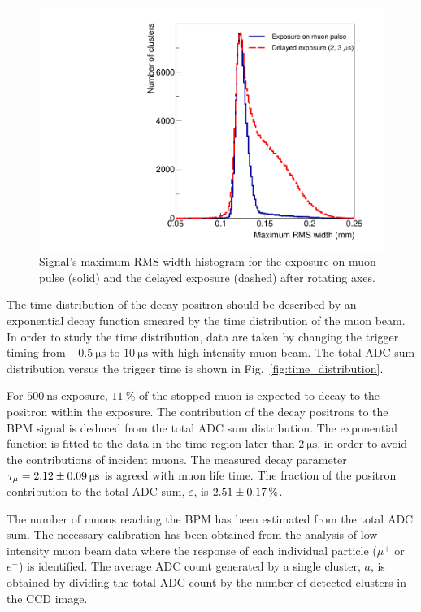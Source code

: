\documentclass[preprint,3p,twocolumn]{elsarticle}
\begin{document}
\begin{figure}[tbp]
	\centering
	\includegraphics[width=\columnwidth]{figure/RMS_legend_v2.pdf}
	\caption{Signal's maximum RMS width histogram for the
          exposure on muon pulse (solid) and the delayed exposure
          (dashed) after rotating axes.}
	\label{fig:positron_width}
\end{figure}

The time distribution of the decay positron should be described
by an exponential decay function smeared by the time distribution
of the muon beam.  In order to study the time distribution, data
are taken by changing the trigger timing from
$\SI{-0.5}{\micro\s}$ to $\SI{10}{\micro\s}$ with high intensity
muon beam. The total ADC sum distribution versus the trigger time
is shown in Fig.~\ref{fig:time_distribution}.

For $\SI{500}{\nano\s}$ exposure, $\SI{11}{\percent}$ of the
stopped muon is expected to decay to the positron within the
exposure. The contribution of the decay positrons to the BPM
signal is deduced from the total ADC sum distribution. The
exponential function is fitted to the data in the time region
later than $\SI{2}{\micro\s}$, in order to avoid the
contributions of incident muons. The measured decay parameter
$\tau_{\mu}=\SI{2.12 \pm 0.09}{\micro\s}$ is agreed with muon
life time. The fraction of the positron contribution to the total
ADC sum, $\varepsilon$, is $\SI{2.51\pm0.17}{\percent}$.

The number of muons reaching the BPM has been estimated from the
total ADC sum. The necessary calibration has been obtained from
the analysis of low intensity muon beam data where the response
of each individual particle ($\mu^+$ or $e^+$) is identified. The
average ADC count generated by a single cluster, $a$, is obtained
by dividing the total ADC count by the number of detected
clusters in the CCD image.
\end{document}
